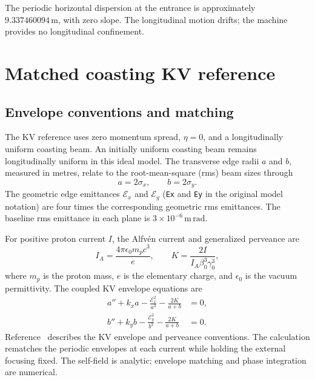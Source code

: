 \documentclass[11pt,a4paper]{article}
\numberwithin{equation}{section}
\newcommand{\units}[1]{\,\mathrm{#1}}
\begin{document}
The periodic horizontal dispersion at the entrance is approximately
$9.337460094\units{m}$, with zero slope. The longitudinal motion drifts;
the machine provides no longitudinal confinement.

\section{Matched coasting KV reference}
\label{sec:kv}

\subsection{Envelope conventions and matching}

The KV reference uses zero momentum spread, $\eta=0$, and a
longitudinally uniform coasting beam. An initially uniform coasting beam
remains longitudinally uniform in this ideal model. The transverse edge
radii $a$ and $b$, measured in metres, relate to the root-mean-square
(rms) beam sizes through
\begin{equation}
  a=2\sigma_x,\qquad b=2\sigma_y.
  \label{eq:edge-radii}
\end{equation}
The geometric edge emittances $\mathcal E_x$ and $\mathcal E_y$
(\texttt{Ex} and \texttt{Ey} in the original model notation) are four times the corresponding geometric rms emittances. The baseline rms
emittance in each plane is $3\times10^{-6}\units{m\,rad}$.

For positive proton current $I$, the Alfv\'en current and generalized
perveance are
\begin{equation}
  I_A=\frac{4\pi\epsilon_0m_pc^3}{e},\qquad
  K=\frac{2I}{I_A\beta_0^3\gamma_0^3},
  \label{eq:perveance}
\end{equation}
where $m_p$ is the proton mass, $e$ is the elementary charge, and
$\epsilon_0$ is the vacuum permittivity. The coupled KV envelope
equations are
\begin{equation}
  \begin{aligned}
    a''+k_xa-\frac{\mathcal E_x^2}{a^3}-\frac{2K}{a+b}&=0,\\
    b''+k_yb-\frac{\mathcal E_y^2}{b^3}-\frac{2K}{a+b}&=0.
  \end{aligned}
  \label{eq:envelopes}
\end{equation}
Reference~\cite{prior} describes the KV envelope and perveance
conventions. The calculation rematches the periodic envelopes at each
current while holding the external focusing fixed. The self-field is
analytic; envelope matching and phase integration are numerical.
\end{document}
